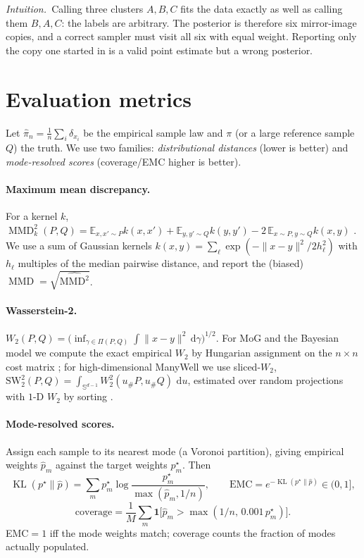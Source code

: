 \documentclass[11pt]{article}
\theoremstyle{plain}
\theoremstyle{remark}
\DeclareMathOperator{\KL}{KL}
\DeclareMathOperator{\MMD}{MMD}
\newcommand{\E}{\mathbb{E}}
\newcommand{\dd}{\,\mathrm{d}}
\newcommand{\plainwords}[1]{\begin{plainbox}\noindent\textit{Intuition.\ }#1\end{plainbox}}
\begin{document}
\plainwords{Calling three clusters $A,B,C$ fits the data exactly as well as
calling them $B,A,C$: the labels are arbitrary. The posterior is therefore six
mirror-image copies, and a correct sampler must visit all six with equal weight.
Reporting only the copy one started in is a valid point estimate but a wrong
posterior.}

\section{Evaluation metrics}\label{sec:metrics}
Let $\hat\pi_n=\frac1n\sum_i\delta_{x_i}$ be the empirical sample law and $\pi$ (or
a large reference sample $Q$) the truth. We use two families: \emph{distributional
distances} (lower is better) and \emph{mode-resolved scores} (coverage/EMC higher
is better).

\paragraph{Maximum mean discrepancy.} For a kernel $k$,
$\MMD^2_k(P,Q)=\E_{x,x'\sim P}k(x,x')+\E_{y,y'\sim Q}k(y,y')-2\,\E_{x\sim P,y\sim Q}k(x,y)$
\cite{gretton2012}. We use a sum of Gaussian kernels
$k(x,y)=\sum_\ell\exp(-\|x-y\|^2/2h_\ell^2)$ with $h_\ell$ multiples of the median
pairwise distance, and report the (biased) $\MMD=\sqrt{\widehat{\MMD^2}}$.

\paragraph{Wasserstein-2.}
$W_2(P,Q)=\big(\inf_{\gamma\in\Pi(P,Q)}\int\|x-y\|^2\dd\gamma\big)^{1/2}$. For MoG and
the Bayesian model we compute the exact empirical $W_2$ by Hungarian assignment on
the $n\times n$ cost matrix \cite{peyre2019}; for high-dimensional ManyWell we use
sliced-$W_2$, $\mathrm{SW}_2^2(P,Q)=\int_{\mathbb S^{d-1}}W_2^2(u_\#P,u_\#Q)\,\dd u$,
estimated over random projections with $1$-D $W_2$ by sorting \cite{bonneel2015}.

\paragraph{Mode-resolved scores.} Assign each sample to its nearest mode (a Voronoi
partition), giving empirical weights $\hat p_m$ against the target weights $p_m^\star$.
Then
\[
\KL(p^\star\|\hat p)=\sum_m p_m^\star\log\frac{p_m^\star}{\max(\hat p_m,1/n)},
\qquad
\mathrm{EMC}=e^{-\KL(p^\star\|\hat p)}\in(0,1],
\]
\[
\text{coverage}=\frac1M\sum_m \mathbf{1}\!\big[\hat p_m>\max(1/n,\,0.001\,p_m^\star)\big].
\]
EMC$=1$ iff the mode weights match; coverage counts the fraction of modes actually
populated.
\end{document}
